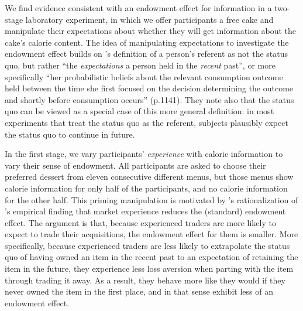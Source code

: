 \documentclass[12pt]{article}
\begin{document}
We find evidence consistent with an endowment effect for information in a two-stage laboratory experiment, in which we offer participants a free cake and manipulate their expectations about whether they will get information about the cake’s calorie content. The idea of manipulating expectations to investigate the endowment effect builds on \citet{koszegiModelReferenceDependentPreferences2006}'s definition of a person’s referent as not the status quo, but rather \enquote{the \emph{expectations} a person held in the \emph{recent} past}, or more specifically \enquote{her probabilistic beliefs about the relevant consumption outcome held between the time she first focused on the decision determining the outcome and shortly before consumption occurs} (p.1141). They note also that the status quo can be viewed as a special case of this more general definition: in most experiments that treat the status quo as the referent, subjects plausibly expect the status quo to continue in future.

In the first stage, we vary participants’ \emph{experience} with calorie information to vary their sense of endowment. All participants are asked to choose their preferred dessert from eleven consecutive different menus, but those menus show calorie information for only half of the participants, and no calorie information for the other half. This priming manipulation is motivated by \citet{koszegiModelReferenceDependentPreferences2006}'s rationalization of \citet{listDoesMarketExperience2003}'s empirical finding that market experience reduces the (standard) endowment effect. The argument is that, because experienced traders are more likely to expect to trade their acquisitions, the endowment effect for them is smaller. More specifically, because experienced traders are less likely to extrapolate the status quo of having owned an item in the recent past to an expectation of retaining the item in the future, they experience less loss aversion when parting with the item through trading it away. As a result, they behave more like they would if they never owned the item in the first place, and in that sense exhibit less of an endowment effect.

\end{document}

